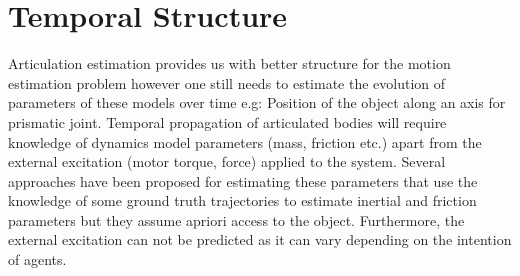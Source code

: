 \documentclass[conference]{IEEEtran}
\begin{document}
\section{Temporal Structure} Articulation estimation provides us with better structure for the motion estimation problem however one still needs to estimate the evolution of parameters of these models over time e.g: Position of the object along an axis for prismatic joint. Temporal propagation of articulated bodies will require knowledge of dynamics model parameters (mass, friction etc.) apart from the external excitation (motor torque, force) applied  to the system. Several approaches have been proposed for estimating these parameters that use the knowledge of some ground truth trajectories to estimate inertial and friction parameters \cite{endres2013learning} but they assume apriori access to the object. Furthermore, the external excitation can not be predicted as it can vary depending on the intention of agents. 
\end{document}
